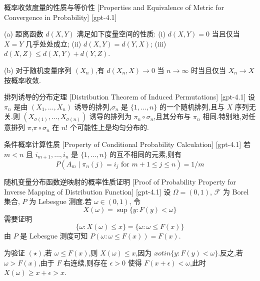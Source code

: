 \documentclass[UTF8]{ctexart}
\begin{document}
    
    
    \begin{thm}
        {概率收敛度量的性质与等价性}
        [Properties and Equivalence of Metric for Convergence in Probability]
        [gpt-4.1]
        
(a) 距离函数 $d(X, Y)$ 满足如下度量空间的性质:
(i) $d(X, Y) = 0$ 当且仅当 $X = Y$ 几乎处处成立;
(ii) $d(X, Y) = d(Y, X)$;
(iii) $d(X, Z) \leq d(X, Y) + d(Y, Z)$.

(b) 对于随机变量序列 $(X_n)$,有 $d(X_n, X) \to 0$ 当 $n \to \infty$ 时当且仅当 $X_n \to X$ 按概率收敛.

    \end{thm}
    
    
    
    \begin{thm}
        {排列诱导的分布定理}
        [Distribution Theorem of Induced Permutations]
        [gpt-4.1]
        设 $\pi_n$ 是由 $(X_1, \ldots, X_n)$ 诱导的排列,$\sigma_n$ 是 $\{1, \ldots, n\}$ 的一个随机排列,且与 $X$ 序列无关.则 $(X_{\sigma(1)}, \ldots, X_{\sigma(n)})$ 诱导的排列为 $\pi_n \circ \sigma_n$,且其分布与 $\pi_n$ 相同.特别地,对任意排列 $\pi$,$\pi \circ \sigma_n$ 在 $n!$ 个可能性上是均匀分布的.

    \end{thm}
    
    
    
    \begin{ppt}
        {条件概率计算性质}
        [Property of Conditional Probability Calculation]
        [gpt-4.1]
        若 $m < n$ 且 $i_{m+1}, \ldots, i_n$ 是 $\{1, \ldots, n\}$ 的互不相同的元素,则有
\[
P \left( A_m \mid \pi_n(j) = i_j \text{ for } m+1 \leq j \leq n \right) = 1 / m
\]

    \end{ppt}
    
    
    
    \begin{prf}
        {随机变量分布函数逆映射的概率性质证明}
        [Proof of Probability Property for Inverse Mapping of Distribution Function]
        [gpt-4.1]
        设 $\Omega = (0, 1)$, $\mathcal{F}$ 为 Borel 集合, $P$ 为 Lebesgue 测度.若 $\omega \in (0, 1)$, 令
\[
X(\omega) = \operatorname*{sup} \{ y : F(y) < \omega \}
\]
需要证明
\[
\{ \omega : X(\omega) \leq x \} = \{ \omega : \omega \leq F(x) \}
\]
由 $P$ 是 Lebesgue 测度可知 $P(\omega : \omega \leq F(x)) = F(x)$.

为验证 $(\star)$,若 $\omega \leq F(x)$,则 $X(\omega) \leq x$,因为 $x 
otin \{ y : F(y) < \omega \}$.反之,若 $\omega > F(x)$,由于 $F$ 右连续,则存在 $\epsilon > 0$ 使得 $F(x + \epsilon) < \omega$,此时 $X(\omega) \geq x + \epsilon > x$.

    \end{prf}
    
\end{document}
